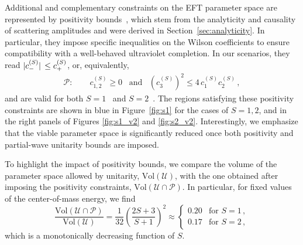 Additional and complementary constraints on the EFT parameter space are represented by positivity
bounds~\cite{Adams:2006sv}, which stem from the analyticity and causality of scattering amplitudes
and were derived in Section~\ref{sec:analyticity}. In particular, they impose specific inequalities
on the Wilson coefficients to ensure compatibility with a well-behaved ultraviolet completion.
%
In our scenarios, they read $\abs*{c_-^{(S)}} \le c_+^{(S)}$, or, equivalently,
%
\begin{align}
\label{eq:positivitybounds}
    \mathscr{P}: \qquad 
    c_{1,2}^{(S)} \ge 0 \,\,\,\,\,\text{and}\,\,\,\,\,
    (c_3^{(S)})^2 \le 4\, c_{1}^{(S)} c_{2}^{(S)}\,,
\end{align}
%
and are valid for both $S=1$~\cite{Adams:2006sv,Rebhan:2017zdx,Remmen:2019cyz,Henriksson:2021ymi,Arkani-Hamed:2020blm} 
and $S=2$~\cite{Gruzinov:2006ie,Bellazzini:2015cra,Endlich:2017tqa,Arkani-Hamed:2020blm,Caron-Huot:2022ugt,Bellazzini:2022wzv}.
%
The regions satisfying these positivity constraints are shown in blue in Figure~\ref{fig:s1} for the cases of $S=1,2$, and in the right panels of Figures \ref{fig:s1_v2} and \ref{fig:s2_v2}.
Interestingly, we emphasize that the viable parameter space is significantly reduced once both positivity and partial-wave unitarity bounds are imposed. 

To highlight the impact of positivity bounds, we compare the volume of the parameter space allowed by unitarity, $\text{Vol}(\mathscr U)$, with the one obtained after imposing the positivity constraints, $\text{Vol}(\mathscr U \cap \mathscr P)$.
In particular, for fixed values of the center-of-mass energy, we find
%
\begin{equation}
\frac{\text{Vol}(\mathscr U \cap \mathscr P)}{\text{Vol}(\mathscr U)} = \frac{1}{32}\left(\frac{2S+3}{S+1}\right)^{\!2}
    \approx 
    \begin{cases}
        0.20 & \text{for }S=1\,,\\
        0.17 & \text{for }S=2\,,
    \end{cases}
\end{equation}
%
which is a monotonically decreasing function of $S$.

